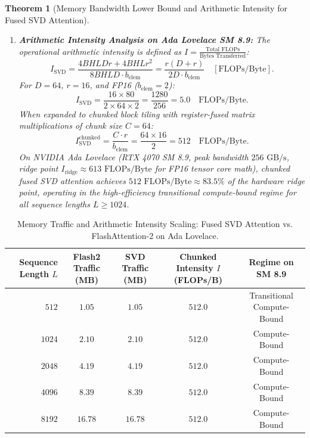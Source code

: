 \documentclass[10pt,journal,compsoc]{IEEEtran}
\newtheorem{theorem}{Theorem}
\begin{document}
\begin{theorem}[Memory Bandwidth Lower Bound and Arithmetic Intensity for Fused SVD Attention]
\begin{enumerate}
    \item \textbf{Arithmetic Intensity Analysis on Ada Lovelace SM 8.9:}
    The operational arithmetic intensity is defined as $I = \frac{\text{Total FLOPs}}{\text{Bytes Transferred}}$:
    \begin{equation}
    I_{\text{SVD}} = \frac{4 B H L D r + 4 B H L r^2}{8 B H L D \cdot b_{\text{elem}}} = \frac{r (D + r)}{2 D \cdot b_{\text{elem}}} \quad [\text{FLOPs/Byte}].
    \end{equation}
    For $D = 64$, $r = 16$, and FP16 ($b_{\text{elem}}=2$):
    \begin{equation}
    I_{\text{SVD}} = \frac{16 \times 80}{2 \times 64 \times 2} = \frac{1280}{256} = 5.0 \quad \text{FLOPs/Byte}.
    \end{equation}
    When expanded to chunked block tiling with register-fused matrix multiplications of chunk size $C=64$:
    \begin{equation}
    I_{\text{SVD}}^{\text{chunked}} = \frac{C \cdot r}{b_{\text{elem}}} = \frac{64 \times 16}{2} = 512 \quad \text{FLOPs/Byte}.
    \end{equation}
    On NVIDIA Ada Lovelace (RTX 4070 SM 8.9, peak bandwidth $256 \text{ GB/s}$, ridge point $I_{\text{ridge}} \approx 613 \text{ FLOPs/Byte}$ for FP16 tensor core math), chunked fused SVD attention achieves $512 \text{ FLOPs/Byte} \approx 83.5\%$ of the hardware ridge point, operating in the high-efficiency transitional compute-bound regime for all sequence lengths $L \ge 1024$.
\end{enumerate}
\end{theorem}

\begin{table}[h]
\centering
\caption{Memory Traffic and Arithmetic Intensity Scaling: Fused SVD Attention vs. FlashAttention-2 on Ada Lovelace.}
\label{tab:arithmetic_intensity}
\begin{tabular}{rcccc}
\toprule
\textbf{Sequence Length} $L$ & \textbf{Flash2 Traffic} (MB) & \textbf{SVD Traffic} (MB) & \textbf{Chunked Intensity} $I$ (FLOPs/B) & \textbf{Regime on SM 8.9} \\
\midrule
$512$ & $1.05$ & $1.05$ & $512.0$ & Transitional Compute-Bound \\
$1024$ & $2.10$ & $2.10$ & $512.0$ & Compute-Bound \\
$2048$ & $4.19$ & $4.19$ & $512.0$ & Compute-Bound \\
$4096$ & $8.39$ & $8.39$ & $512.0$ & Compute-Bound \\
$8192$ & $16.78$ & $16.78$ & $512.0$ & Compute-Bound \\
\bottomrule
\end{tabular}
\end{table}
\end{document}
